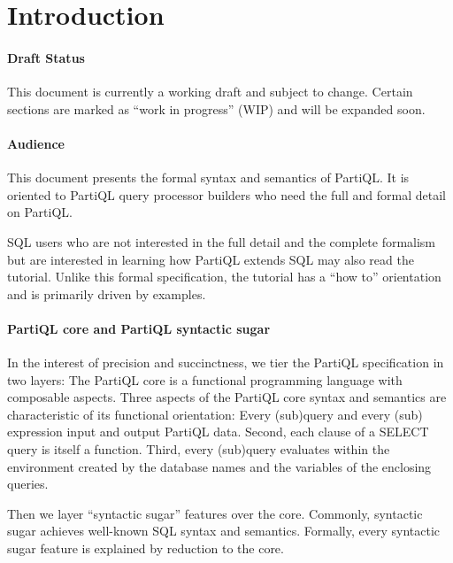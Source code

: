 \section{Introduction}
\label{sec:introduction}

\paragraph{Draft Status} This document is currently a working draft and subject
to change.  Certain sections are marked as ``work in progress'' (WIP) and will
be expanded soon.

\paragraph{Audience} This document presents the formal syntax and semantics of
PartiQL. It is oriented to PartiQL query processor builders who need the full
and formal detail on PartiQL.

SQL users who are not interested in the full detail and the complete formalism
but are interested in learning how PartiQL extends SQL may also read the
tutorial. Unlike this formal specification, the tutorial has a ``how to''
orientation and is primarily driven by examples. 

\paragraph{PartiQL core and PartiQL syntactic sugar}
In the interest of precision and succinctness, we tier the PartiQL specification
in two layers: The PartiQL core is a functional programming language with
composable aspects. Three aspects of the PartiQL core syntax and semantics are
characteristic of its functional orientation: Every (sub)query and every (sub)
expression input and output PartiQL data. Second, each clause of a SELECT query
is itself a function. Third, every (sub)query evaluates within the environment
created by the database names and the variables of the enclosing queries.

Then we layer ``syntactic sugar'' features over the core. Commonly, syntactic
sugar achieves well-known SQL syntax and semantics. Formally, every syntactic
sugar feature is explained by reduction to the core.

\pagebreak
